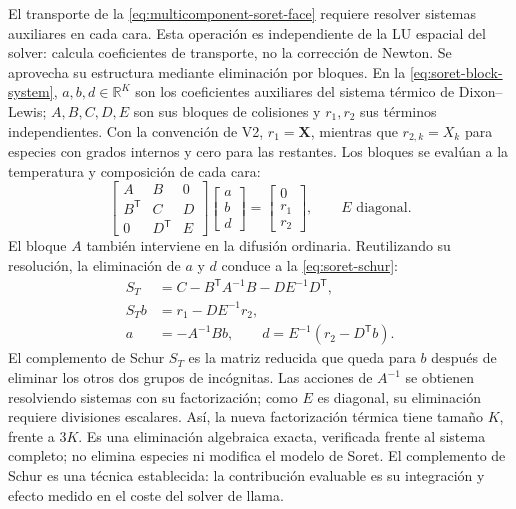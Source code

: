 \documentclass[12pt,a4paper,twoside,openany]{book}
\newcommand{\vect}[1]{\bm{#1}}
\begin{document}
El transporte de la \cref{eq:multicomponent-soret-face} requiere resolver
sistemas auxiliares en cada cara. Esta operación es independiente de la LU
espacial del solver: calcula coeficientes de transporte, no la corrección de
Newton. Se aprovecha su estructura mediante eliminación por bloques.
En la \cref{eq:soret-block-system}, \(a,b,d\in\mathbb R^K\) son los
coeficientes auxiliares del sistema térmico de Dixon--Lewis; \(A,B,C,D,E\)
son sus bloques de colisiones y \(r_1,r_2\) sus términos independientes.
Con la convención de V2, \(r_1=\vect X\), mientras que
\(r_{2,k}=X_k\) para especies con grados internos y cero para las restantes.
Los bloques se evalúan a la temperatura y composición de cada cara:
\begin{equation}
 \begin{bmatrix}A&B&0\\B^{\mathsf T}&C&D\\0&D^{\mathsf T}&E\end{bmatrix}
 \begin{bmatrix}a\\b\\d\end{bmatrix}
 =\begin{bmatrix}0\\r_1\\r_2\end{bmatrix},
 \qquad E\text{ diagonal}.
 \label{eq:soret-block-system}
\end{equation}
El bloque \(A\) también interviene en la difusión ordinaria. Reutilizando su
resolución, la eliminación de \(a\) y \(d\) conduce a la \cref{eq:soret-schur}:
\begin{equation}
 \begin{aligned}
 S_T&=C-B^{\mathsf T}A^{-1}B-DE^{-1}D^{\mathsf T},\\
 S_Tb&=r_1-DE^{-1}r_2,\\
 a&=-A^{-1}Bb,\qquad d=E^{-1}(r_2-D^{\mathsf T}b).
 \end{aligned}
 \label{eq:soret-schur}
\end{equation}
El complemento de Schur \(S_T\) es la matriz reducida que queda para \(b\)
después de eliminar los otros dos grupos de incógnitas. Las acciones de
\(A^{-1}\) se obtienen resolviendo sistemas con su factorización; como \(E\)
es diagonal, su eliminación requiere divisiones escalares. Así, la nueva
factorización térmica tiene tamaño \(K\), frente a \(3K\).
Es una eliminación algebraica exacta, verificada frente al sistema completo;
no elimina especies ni modifica el modelo de Soret. El complemento de Schur
es una técnica establecida: la contribución evaluable es su integración y
efecto medido en el coste del solver de llama.
\end{document}
